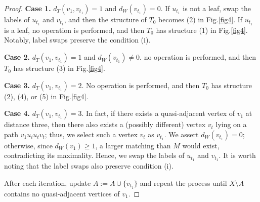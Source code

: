 \documentclass[12pt]{amsart}
\begin{document}
\begin{proof}
{\flushleft\bf Case 1.} \(d_T(v_1, v_{t_1}) = 1\) and \(d_W(v_{t_1}) = 0\). If \(u_{t_1}\) is not a leaf, swap the labels of \(u_{t_1}\) and \(v_{t_1}\), and then the structure of \(T_0\) becomes (2) in Fig.\ref{fig4}. If \(u_{t_1}\) is a leaf, no operation is performed, and then \(T_0\) has structure (1) in Fig.\ref{fig4}. Notably, label swaps preserve the condition (i).

{\flushleft\bf Case 2.} \(d_T(v_1, v_{t_1}) = 1\) and \(d_W(v_{t_1}) \neq 0\). no operation is performed, and then \(T_0\) has structure (3) in Fig.\ref{fig4}. 

{\flushleft\bf Case 3.} \(d_T(v_1, v_{t_1}) = 2\). No operation is performed, and then \(T_0\) has structure (2), (4), or (5) in Fig.\ref{fig4}.

{\flushleft\bf Case 4.} \(d_T(v_1, v_{t_1}) = 3\). In fact, if there exists a quasi-adjacent vertex of \(v_1\) at distance three, then there also exists a (possibly different) vertex \(v_t\) lying on a path \(v_1u_iu_tv_t\);
thus, we select such a vertex \(v_t\) as \(v_{t_1}\). We assert \(d_W(v_{t_1}) = 0\); otherwise, since \(d_W(v_1) \ge 1\), 
a larger matching than \(M\) would exist, contradicting its maximality. Hence, we swap the labels of \(u_{t_1}\) and \(v_{t_1}\). It is worth noting that the label swaps also preserve condition (i).


After each iteration, update \(A := A \cup \{v_{t_1}\}\) and repeat the process 
until \(X \setminus A\) contains no quasi-adjacent vertices of \(v_1\).


\end{proof}
\end{document}
